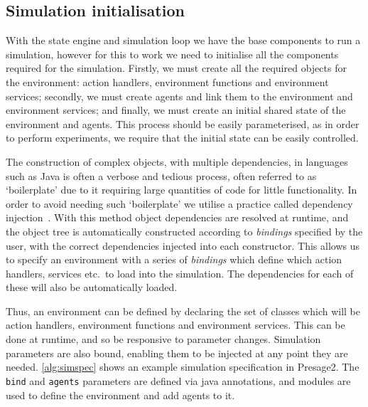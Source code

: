 \subsection{Simulation initialisation}

With the state engine and simulation loop we have the base components to run a
simulation, however for this to work we need to initialise all the
components required for the simulation. Firstly, we must create all the required
objects for the environment: action handlers, environment functions and
environment services; secondly, we must create agents and link them to the
environment and environment services; and finally, we must create an initial
shared state of the environment and agents. This process should be easily
parameterised, as in order to perform experiments, we require that the initial state
can be easily controlled.

The construction of complex objects, with multiple dependencies, in languages
such as Java is often a verbose and tedious process, often referred to as 
`boilerplate' due to it requiring large quantities of code for little
functionality. In order to avoid needing such `boilerplate' we utilise a
practice called dependency injection~\citep{vanbrabant2008}. With this method
object dependencies are resolved at runtime, and the object tree is
automatically constructed according to \emph{bindings} specified by the user, with the
correct dependencies injected into each constructor. This allows us to specify
an environment with a series of \emph{bindings} which define which action
handlers, services etc.\ to load into the simulation. The dependencies for each of
these will also be automatically loaded.


Thus, an environment can be defined by declaring the set of classes which will
be action handlers, environment functions and environment services. This can
be done at runtime, and so be responsive to parameter changes. Simulation
parameters are also bound, enabling them to be injected at any point they are
needed. \autoref{alg:simspec} shows an example simulation specification in
Presage2. The \texttt{bind} and \texttt{agents} parameters are defined via
java annotations, and modules are used to define the environment and add
agents to it.

